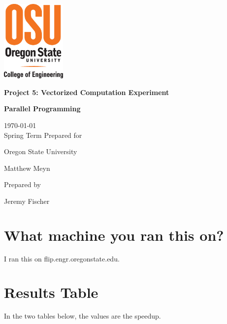 \documentclass[onecolumn,draftclsnofoot, 10pt, compsoc]{IEEEtran}
\def \Jeremy{			Jeremy Fischer}
\def \Class{		Parallel Programming}
\def \Assn{		Project 5: Vectorized Computation Experiment}
\def \School{	Oregon State University}
\def \Professor{		Matthew Meyn}
\begin{document}
\begin{titlepage}
    \begin{singlespace}
    	\includegraphics[height=4cm]{coe.eps}
        \hfill  
        \par\vspace{.2in}
        \centering
        \scshape{
            \vspace{.5in}
            \textbf{\Large\Assn}\par
            \textbf{\large\Class}\par
            \large{
            	\today \\Spring Term
        	}
            \vfill
            {\large Prepared for}\par
            \huge \School\par
            \vspace{5pt}
            {\Large{\Professor}\par}
            {\large Prepared by }\par

            \vspace{5pt}
            {\Large
                {\Jeremy}\par
            }
            \vspace{20pt}
        }

    \end{singlespace}
\end{titlepage}
\newpage
{}

\clearpage





	\section{What machine you ran this on?}
		I ran this on flip.engr.oregonstate.edu.
	
	
	\section{Results Table}
	In the two tables below, the values are the speedup.
	
\end{document}
